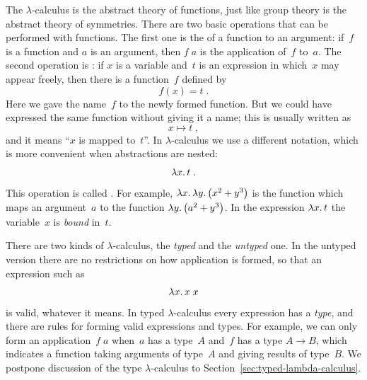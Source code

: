 The $\lambda$-calculus is the abstract theory of functions, just like
group theory is the abstract theory of symmetries. There are two basic
operations that can be performed with functions. The first one is the
 of a function to an argument: if~$f$ is a function
and $a$ is an argument, then $f\; a$ is the application of~$f$ to~$a$.
The second operation is : if $x$ is a variable
and~$t$ is an expression in which~$x$ may appear freely, then there is
a function~$f$ defined by
%
\begin{equation*}
  f(x) = t \;.
\end{equation*}
%
Here we gave the name~$f$ to the newly formed function. But we could
have expressed the same function without giving it a name;
this is usually written as
%
\begin{equation*}
  x \mapsto t \;,
\end{equation*}
%
and it means ``$x$ is mapped to~$t$''. In $\lambda$-calculus we use a
different notation, which is more convenient when abstractions are
nested:
%
\begin{equation*}
  \lambda x .\,t \;.
\end{equation*}
%
This operation is called . For example,
$\lambda x .\,\lambda y .\left(x^2 + y^3\right)$ is the function which maps an
argument~$a$ to the function $\lambda y .\left(a^2 + y^3\right)$. In the expression
$\lambda x .\,t$ the variable~$x$ is \emph{bound} in~$t$.

There are two kinds of $\lambda$-calculus, the \emph{typed} and the
\emph{untyped} one. In the untyped version there are no restrictions
on how application is formed, so that an expression such as
%
\begin{equation*}
  \lambda x .\,x\; x
\end{equation*}
%
is valid, whatever it means. In typed $\lambda$-calculus every
expression has a \emph{type}, and there are rules for forming valid
expressions and types. For example, we can only form an
application~$f\; a$ when~$a$ has a type~$A$ and~$f$ has a type $A \to
B$, which indicates a function taking arguments of type~$A$ and giving
results of type~$B$. We postpone discussion of the type
$\lambda$-calculus to Section~\ref{sec:typed-lambda-calculus}.

